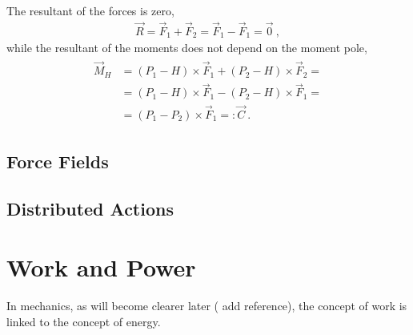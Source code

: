 \documentclass[letterpaper,10pt,english]{jupyterBook}
\begin{document}
\sphinxAtStartPar
{} 

\sphinxAtStartPar
The resultant of the forces is zero,
\begin{equation*}
\begin{split}\vec{R} = \vec{F}_1 + \vec{F}_2 = \vec{F}_1 - \vec{F}_1 = \vec{0} \ ,\end{split}
\end{equation*}
\sphinxAtStartPar
while the resultant of the moments does not depend on the moment pole,
\begin{equation*}
\begin{split}\begin{aligned}
  \vec{M}_H & = (P_1 - H) \times \vec{F}_1 + (P_2 - H) \times \vec{F}_2 = \\
  & = (P_1 - H) \times \vec{F}_1 - (P_2 - H) \times \vec{F}_1 = \\
  & = (P_1 - P_2) \times \vec{F}_1 =: \vec{C} \ .
\end{aligned}\end{split}
\end{equation*}

\subsection{Force Fields}
\label{\detokenize{ch/actions-types:force-fields}}
\sphinxAtStartPar
{}


\subsection{Distributed Actions}
\label{\detokenize{ch/actions-types:distributed-actions}}
\sphinxAtStartPar
{}

\sphinxstepscope


\section{Work and Power}
\label{\detokenize{ch/actions-work:work-and-power}}\label{\detokenize{ch/actions-work:classical-mechanics-actions-work}}\label{\detokenize{ch/actions-work::doc}}
\sphinxAtStartPar
In mechanics, as will become clearer later ( add reference), the concept of work is linked to the concept of energy. 
\end{document}
